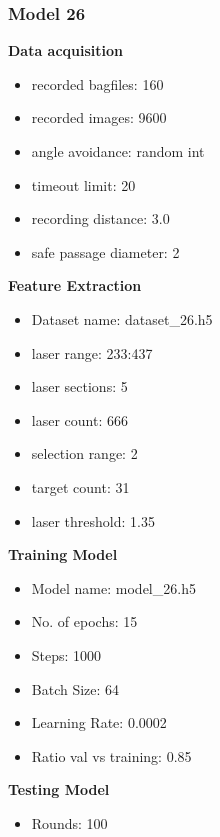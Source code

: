 \subsubsection{Model 26\label{model_26} }
\begin{multicols}{2}\textbf{Data acquisition}
\begin{itemize}
\setlength\itemsep{0.1em}
\item recorded bagfiles: 160
\item recorded images: 9600
\item angle avoidance: random int
\item timeout limit: 20
\item recording distance: 3.0
\item safe passage diameter: 2
\end{itemize}
\textbf{Feature Extraction}
\begin{itemize}
\setlength\itemsep{0.1em}
\item Dataset name: dataset\_26.h5
\item  laser range: 233:437
\item  laser sections: 5
\item  laser count: 666
\item  selection range: 2
\item  target count: 31
\item  laser threshold: 1.35
\end{itemize}
\columnbreak\textbf{Training Model}
\begin{itemize}
\setlength\itemsep{0.1em}
\item  Model name: model\_26.h5
\item  No. of epochs: 15
\item  Steps: 1000
\item  Batch Size: 64
\item  Learning Rate: 0.0002
\item  Ratio val vs training: 0.85
\end{itemize}
\textbf{Testing Model}
\begin{itemize}
\setlength\itemsep{0.1em}
\item Rounds: 100
\newline
\newline
\newline
\newline
\newline
\newline
\newline
\newline

\end{itemize}
\end{multicols}
